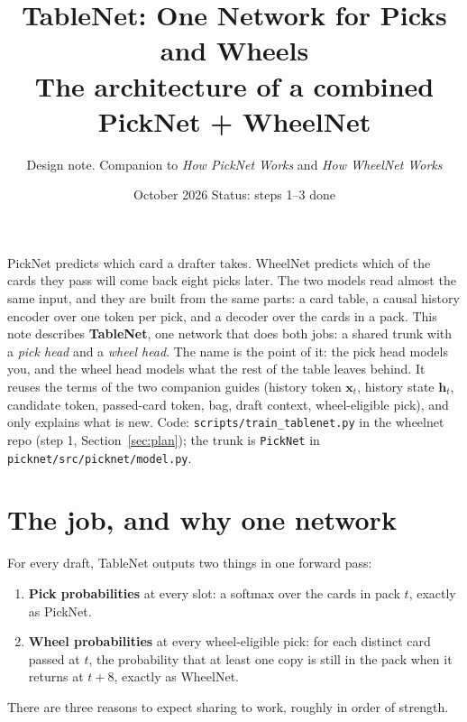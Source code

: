 \documentclass[11pt,letterpaper]{article}
\title{\Large\bfseries TableNet: One Network for Picks and Wheels\\[2pt]\large The architecture of a combined PickNet + WheelNet}
\author{Design note. Companion to \emph{How PickNet Works} and \emph{How WheelNet Works}}
\date{\small October 2026 \quad\textperiodcentered\quad Status: steps 1--3 done}
\newcommand{\code}[1]{\texttt{\small #1}}
\begin{document}
\maketitle

\noindent PickNet predicts which card a drafter takes. WheelNet predicts which of the cards they pass will
come back eight picks later. The two models read almost the same input, and they are built from the same
parts: a card table, a causal history encoder over one token per pick, and a decoder over the cards in a
pack. This note describes \textbf{TableNet}, one network that does both jobs: a shared trunk with a
\emph{pick head} and a \emph{wheel head}. The name is the point of it: the pick head models you, and the
wheel head models what the rest of the table leaves behind. It reuses the terms of the two companion guides (history token $\mathbf x_t$, history
state $\mathbf h_t$, candidate token, passed-card token, bag, draft context, wheel-eligible pick), and only
explains what is new. Code: \code{scripts/train\_tablenet.py} in the wheelnet repo (step 1,
Section~\ref{sec:plan}); the trunk is \code{PickNet} in \code{picknet/src/picknet/model.py}.

{\small\setlength{\parskip}{0pt}\tableofcontents}

\section{The job, and why one network}

For every draft, TableNet outputs two things in one forward pass:

\begin{enumerate}
\item \textbf{Pick probabilities} at every slot: a softmax over the cards in pack $t$, exactly as PickNet.
\item \textbf{Wheel probabilities} at every wheel-eligible pick: for each distinct card passed at $t$, the
probability that at least one copy is still in the pack when it returns at $t+8$, exactly as WheelNet.
\end{enumerate}

There are three reasons to expect sharing to work, roughly in order of strength.
\end{document}
